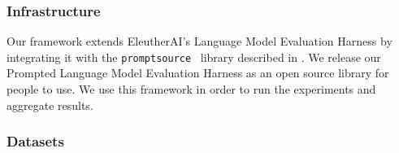 \documentclass[twoside,11pt]{article}
\begin{document}
\begin{table}[ht!]
    \centering\small
    \caption{Four prompts for the WMT'14 dataset \citep{bojar-etal-2014-findings} for MT evaluation. Above, ``L1'' and ``L2'' are~ replaced with language names (e.g.~``Bengali'' and ``Russian'').}
    \label{tab:prompt-examples}
\end{table}

\subsubsection{Infrastructure} 
Our framework extends EleutherAI's Language Model Evaluation Harness \citep{eval-harness} by integrating it with the \texttt{promptsource}~\citep{bach2022promptsource} library described in . We release our Prompted Language Model Evaluation Harness %
as an open source library for people to use.
We use this framework in order to run the experiments and aggregate results.

\subsubsection{Datasets} 
\end{document}

